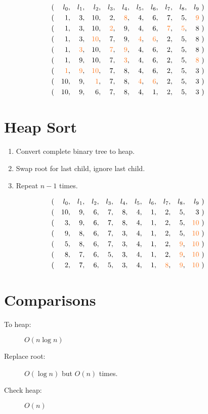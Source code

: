 \documentclass{iansnotes}
\begin{document}
  \begin{align*}
  &(&l_0&,&l_1&,&l_2&,&l_3&,&l_4&,&l_5&,&l_6&,&l_7&,&l_8&,&l_9\ &)&\\
  &(&1&,&3&,&10&,&2&,&{\color{atuorange}8}&,&4&,&6&,&7&,&5&,&{\color{atuorange}9}\ &)&\\
  &(&1&,&3&,&10&,&{\color{atuorange}2}&,&9&,&4&,&6&,&{\color{atuorange}7}&,&{\color{atuorange}5}&,&8\ &)&\\
  &(&1&,&3&,&{\color{atuorange}10}&,&7&,&9&,&{\color{atuorange}4}&,&{\color{atuorange}6}&,&2&,&5&,&8\ &)&\\
  &(&1&,&{\color{atuorange}3}&,&10&,&{\color{atuorange}7}&,&{\color{atuorange}9}&,&4&,&6&,&2&,&5&,&8\ &)&\\
  &(&1&,&9&,&10&,&7&,&{\color{atuorange}3}&,&4&,&6&,&2&,&5&,&{\color{atuorange}8}\ &)&\\
  &(&{\color{atuorange}1}&,&{\color{atuorange}9}&,&{\color{atuorange}10}&,&7&,&8&,&4&,&6&,&2&,&5&,&3\ &)&\\
  &(&10&,&9&,&{\color{atuorange}1}&,&7&,&8&,&{\color{atuorange}4}&,&{\color{atuorange}6}&,&2&,&5&,&3\ &)&\\
  &(&10&,&9&,&6&,&7&,&8&,&4&,&1&,&2&,&5&,&3\ &)&\\
  \end{align*}
  
  \section*{Heap Sort}
    \begin{enumerate}
      \item Convert complete binary tree to heap.
      \item Swap root for last child, ignore last child.
      \item Repeat \(n-1\) times.
    \end{enumerate}

    \begin{align*}
      &(&l_0&,&l_1&,&l_2&,&l_3&,&l_4&,&l_5&,&l_6&,&l_7&,&l_8&,&l_9\ &)&\\
      &(&10&,&9&,&6&,&7&,&8&,&4&,&1&,&2&,&5&,&3\ &)&\\
      &(&3&,&9&,&6&,&7&,&8&,&4&,&1&,&2&,&5&,&{\color{atuorange}10}\ &)&\\
      &(&9&,&8&,&6&,&7&,&3&,&4&,&1&,&2&,&5&,&{\color{atuorange}10}\ &)&\\
      &(&5&,&8&,&6&,&7&,&3&,&4&,&1&,&2&,&{\color{atuorange}9}&,&{\color{atuorange}10}\ &)&\\
      &(&8&,&7&,&6&,&5&,&3&,&4&,&1&,&2&,&{\color{atuorange}9}&,&{\color{atuorange}10}\ &)&\\
      &(&2&,&7&,&6&,&5&,&3&,&4&,&1&,&{\color{atuorange}8}&,&{\color{atuorange}9}&,&{\color{atuorange}10}\ &)&\\
    \end{align*}

  \section*{Comparisons}

    \begin{description}
      \item[To heap:] \(O(n \log n)\)
      \item[Replace root:] \(O(\log n)\) but \( O(n) \) times.
      \item[Check heap:] \(O(n)\) 
    \end{description}

  
\end{document}
